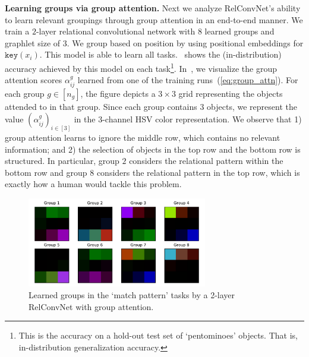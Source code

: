 \textbf{Learning groups via group attention.} Next we analyze RelConvNet's ability to learn relevant groupings through group attention in an end-to-end manner. We train a $2$-layer relational convolutional network with $8$ learned groups and graphlet size of $3$. We group based on position by using positional embeddings for $\mathtt{key}(x_i)$. This model is able to learn all tasks.~ shows the (in-distribution) accuracy achieved by this model on each task\footnote{This is the accuracy on a hold-out test set of `pentominoes' objects. That is, in-distribution generalization accuracy.}. In~, we visualize the group attention scores $\alpha_{ij}^g$ learned from one of the training runs~(\cref{eq:group_attn}). For each group $g \in [n_g]$, the figure depicts a $3 \times 3$ grid representing the objects attended to in that group. Since each group contains $3$ objects, we represent the value $(\alpha_{ij}^g)_{i \in [3]}$ in the $3$-channel HSV color representation. We observe that 1) group attention learns to ignore the middle row, which contains no relevant information; and 2) the selection of objects in the top row and the bottom row is structured. In particular, group $2$ considers the relational pattern within the bottom row and group $8$ considers the relational pattern in the top row, which is exactly how a human would tackle this problem.

\begin{figure}
    \centering
    \includegraphics[width=0.7\textwidth]{figs/group_attn_figs/match_patt_group_attn_map.pdf}
    \caption{Learned groups in the `match pattern' tasks by a 2-layer RelConvNet with group attention.}\label{fig:matchpatt_groupattn}
\end{figure}
